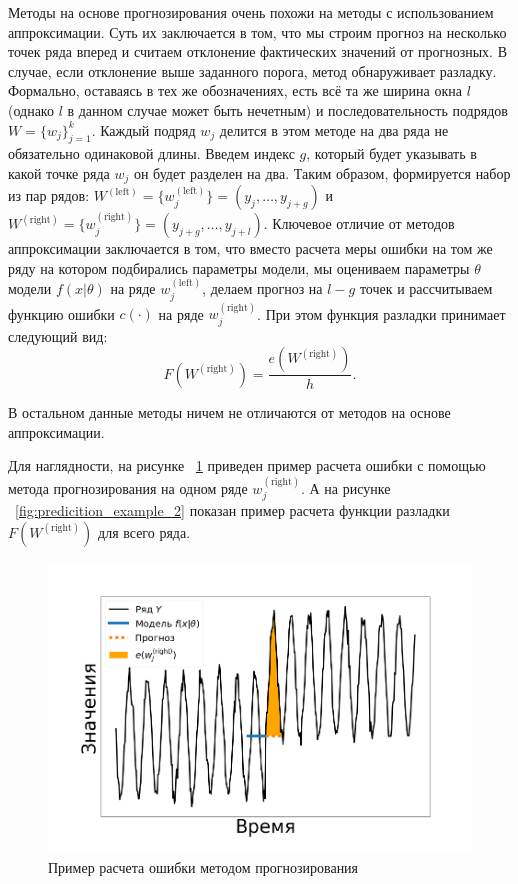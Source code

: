 \documentclass[%
12pt,
master,  %
natbib,      %
subf,        %
substylefile = spbu.rtx,
href,        %
colorlinks,  %
]{disser}
\begin{document}
Методы на основе прогнозирования очень похожи на методы с использованием аппроксимации. Суть их заключается в том, что мы строим прогноз на несколько точек ряда вперед и считаем отклонение фактических значений от прогнозных. В случае, если отклонение выше заданного порога, метод обнаруживает разладку.
Формально, оставаясь в тех же обозначениях, есть всё та же ширина окна $l$ (однако $l$ в данном случае может быть нечетным) и последовательность подрядов $W = \{ w_j \}_{j=1}^k$. Каждый подряд  $w_j$ делится в этом методе на два ряда не обязательно одинаковой длины. Введем индекс $g$, который будет указывать в какой точке ряда $w_j$ он будет разделен на два. Таким образом, формируется набор из пар рядов:  $ W^{\mathrm{(left)}} = \{w_j^{\mathrm{(left)}} \}  =  (y_j, \dots, y_{j+g})$ и $W^{\mathrm{(right)}} = \{w_j^{\mathrm{(right)}} \} = (y_{j+g}, \dots, y_{j+l})$. Ключевое отличие от методов аппроксимации заключается в том, что вместо расчета меры ошибки на том же ряду на котором подбирались параметры модели, мы оцениваем параметры $\theta$ модели $f(x|\theta)$ на ряде $ w_j^{\mathrm{(left)}} $, делаем прогноз на $ l - g $ точек и рассчитываем функцию ошибки $ c(\cdot) $ на ряде $ w_j^{\mathrm{(right)}} $. При этом функция разладки принимает следующий вид:
	$$ F(W^{\mathrm{(right)}}) = \frac{e(W^{\mathrm{(right)}})}{h}.$$

В остальном данные методы ничем не отличаются от методов на основе аппроксимации.

Для наглядности, на рисунке ~\ref{fig:predicition_example_1} приведен пример расчета ошибки с помощью метода прогнозирования на одном ряде  $ w_j^{\mathrm{(right)}} $. А на рисунке ~\ref{fig:predicition_example_2} показан пример расчета функции разладки $ F(W^{\mathrm{(right)}}) $ для всего ряда.

\begin{figure}[!hhh]
	\begin{center}
		\includegraphics[width=12cm]{approaches_first_4_ru}
	\end{center}
	\vspace{-5mm}\caption{Пример расчета ошибки методом прогнозирования}
	\label{fig:predicition_example_1}
\end{figure}
\end{document}
